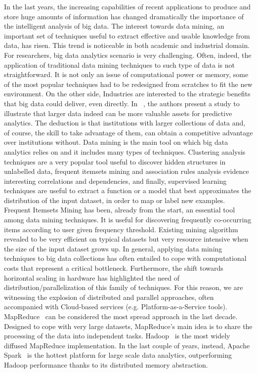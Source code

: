 In the last years, the increasing capabilities of recent applications to produce and store huge amounts of information has changed dramatically the importance of the intelligent analysis of big data. The interest towards data mining, an important set of techniques useful to extract effective and usable knowledge from data, has risen. 
This trend is noticeable in both academic and industrial domain. For researchers, big data analytics scenario is very challenging. Often, indeed, the application of traditional data mining techniques to such type of data is not straightforward.
It is not only an issue of computational power or memory, some of the most popular techniques had to be redesigned from scratches to fit the new environment. 
On the other side, Industries are interested to the strategic benefits that big data could deliver, even directly. In ~\cite{junque2013predictive}, the authors present a study to illustrate that larger data indeed can be more valuable assets for predictive analytics. The deduction is that institutions with larger collections of data and, of course, the skill to take advantage of them, can obtain a competitive advantage over institutions without.
Data mining is the main tool on which big data analytics relies on and it includes many types of techniques. Clustering analysis techniques are a very popular tool useful to discover hidden structures in unlabelled data, frequent itemsets mining and association rules analysis evidence interesting correlations and dependencies, and finally, supervised learning techniques are useful to extract a function or a model that best approximates the distribution of the input dataset, in order to map or label new examples. 
Frequent Itemsets Mining has been, already from the start, an essential tool among data mining techniques. It is useful for discovering frequently co-occurring items according to user given frequency threshold. Existing mining algorithm revealed to be very efficient on typical datasets but very resource intensive when the size of the input dataset grows up. In general, applying data mining techniques to big data collections has often entailed to cope with computational costs that represent a critical bottleneck. Furthermore, the shift towards horizontal scaling in hardware has highlighted the need of distribution/parallelization of this family of techniques. For this reason, we are witnessing the explosion of distributed and parallel approaches, often accompanied with Cloud-based services (e.g. Platform-as-a-Service tools).
MapReduce~\cite{ArticoloMapReduceGoogle} can be considered the most spread approach in the last decade. Designed to cope with very large datasets, MapReduce’s main idea is to share the processing of the data into independent tasks. Hadoop~\cite{HDFS} is the most widely diffused MapReduce implementation. In the last couple of years, instead, Apache Spark~\cite{Zaharia_spark} is the hottest platform for large scale data analytics, outperforming Hadoop performance thanks to its distributed memory abstraction.
